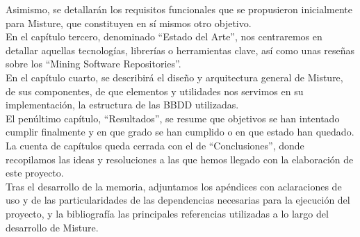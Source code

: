 Asimismo, se detallarán los requisitos funcionales que se propusieron inicialmente para Misture, que constituyen en sí mismos otro objetivo.\\


En el capítulo tercero, denominado ``Estado del Arte'', nos centraremos en detallar aquellas tecnologías, librerías o herramientas clave, así como unas reseñas sobre los ``Mining Software Repositories''.\\


En el capítulo cuarto, se describirá el diseño y arquitectura general de Misture, de sus componentes, de que elementos y utilidades nos servimos en su implementación, la estructura de las BBDD utilizadas.\\


El penúltimo capítulo, ``Resultados'', se resume que objetivos se han intentado cumplir finalmente y en que grado se han cumplido o en que estado han quedado.\\


La cuenta de capítulos queda cerrada con el de ``Conclusiones'', donde recopilamos las ideas y resoluciones a las que hemos llegado con la elaboración de este proyecto.\\


Tras el desarrollo de la memoria, adjuntamos los apéndices con aclaraciones de uso y de las particularidades de las dependencias necesarias para la ejecución del proyecto, y la bibliografía las principales referencias utilizadas a lo largo del desarrollo de Misture.


